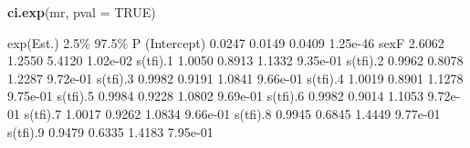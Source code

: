 \documentclass[
]{book}
\newenvironment{Shaded}{\begin{snugshade}}{\end{snugshade}}
\newcommand{\AttributeTok}[1]{\textcolor[rgb]{0.13,0.29,0.53}{#1}}
\newcommand{\ConstantTok}[1]{\textcolor[rgb]{0.56,0.35,0.01}{#1}}
\newcommand{\FunctionTok}[1]{\textcolor[rgb]{0.13,0.29,0.53}{\textbf{#1}}}
\newcommand{\NormalTok}[1]{#1}
\begin{document}
\begin{enumerate}
\begin{Shaded}
\end{Shaded}

\begin{Shaded}
\begin{Highlighting}[]
\FunctionTok{ci.exp}\NormalTok{(mr, }\AttributeTok{pval =} \ConstantTok{TRUE}\NormalTok{)}
\end{Highlighting}
\end{Shaded}

\begin{Shaded}
\begin{Highlighting}[]
\NormalTok{            exp(Est.)   2.5\%  97.5\%        P}
\NormalTok{(Intercept)    0.0247 0.0149 0.0409 1.25e{-}46}
\NormalTok{sexF           2.6062 1.2550 5.4120 1.02e{-}02}
\NormalTok{s(tfi).1       1.0050 0.8913 1.1332 9.35e{-}01}
\NormalTok{s(tfi).2       0.9962 0.8078 1.2287 9.72e{-}01}
\NormalTok{s(tfi).3       0.9982 0.9191 1.0841 9.66e{-}01}
\NormalTok{s(tfi).4       1.0019 0.8901 1.1278 9.75e{-}01}
\NormalTok{s(tfi).5       0.9984 0.9228 1.0802 9.69e{-}01}
\NormalTok{s(tfi).6       0.9982 0.9014 1.1053 9.72e{-}01}
\NormalTok{s(tfi).7       1.0017 0.9262 1.0834 9.66e{-}01}
\NormalTok{s(tfi).8       0.9945 0.6845 1.4449 9.77e{-}01}
\NormalTok{s(tfi).9       0.9479 0.6335 1.4183 7.95e{-}01}
\end{Highlighting}
\end{Shaded}


\end{enumerate}
\end{document}
